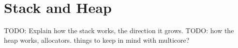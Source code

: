 \chapter{Stack and Heap}

TODO: Explain how the stack works, the direction it grows.
TODO: how the heap works, allocators. things to keep in
mind with multicore?
